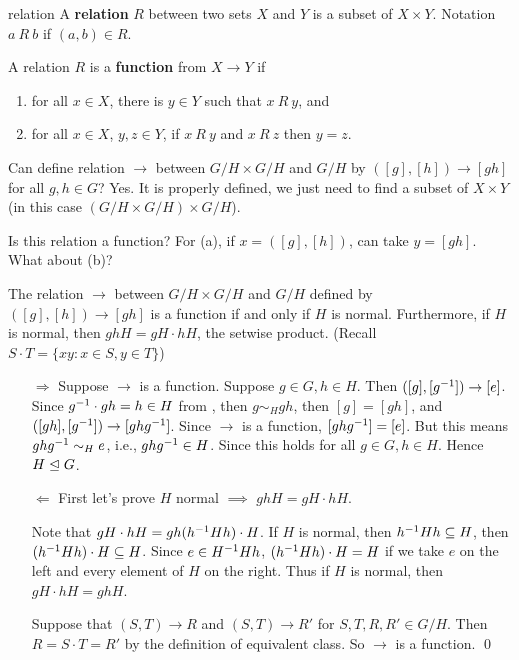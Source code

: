 \begin{defn}{relation}
A \textbf{relation} $R$ between two sets $X$ and $Y$ is a subset of $X\times Y$. Notation $a~R~b$ if $(a,b)\in R$.

A relation $R$ is a \textbf{function} from $X\to Y$ if 
\begin{enumerate}[label=(\alph*)]
\item for all $x\in X$, there is $y\in Y$ such that $x ~R~ y$, and 
\item for all $x\in X$, $y,z\in Y$, if $x ~R~ y$ and $x ~R~ z$ then $y=z$.
\end{enumerate}
\end{defn}

Can define relation $\to$ between $G/H\times G/H$ and $G/H$ by $([g],[h])\to [gh]$ for all $g,h\in G$? Yes. It is properly defined, we just need to find a subset of $X\times Y$ (in this case $(G/H\times G/H)\times G/H$).

Is this relation a function? For (a), if $x=([g],[h])$, can take $y=[gh]$. What about (b)?

\begin{lemma}
The relation $\to$ between $G/H\times G/H$ and $G/H$ defined by $([g],[h])\to [gh]$ is a function if and only if  $H$ is normal.
Furthermore, if $H$ is normal, then $ghH = gH\cdot hH$, the setwise product. (Recall $S\cdot T=\{xy:x\in S,y\in T\}$)
\end{lemma}

\begin{pfno}
\begin{itemize}
\item[$\Rightarrow$] Suppose $\to$ is a function. Suppose $g\in G, h\in H$. Then $([g],[g^{-1}])\to [e]$. Since $g^{-1} \cdot gh = h\in H$ from , then $g\sim_Hgh$, then $[g]=[gh]$, and $([gh],[g^{-1}])\to [ghg^{-1}]$. Since $\to$ is a function, $[ghg^{-1}]=[e]$. But this means $ghg^{-1} \sim_H e$, i.e., $ghg^{-1} \in H$. Since this holds for all $g\in G, h\in H$. Hence $H\trianglelefteq G$. 
\item[$\Leftarrow$] First let's prove $H$ normal $\implies$ $ghH = gH\cdot hH$. 

Note that $gH\cdot hH=gh(h^{-1} Hh) \cdot H$. If $H$ is normal, then $h^{-1} Hh\subseteq H$, then $(h^{-1} Hh)\cdot H\subseteq H$. Since $e\in H^{-1} Hh$, $(h^{-1} Hh)\cdot H=H$ if we take $e$ on the left and every element of $H$ on the right. Thus if $H$ is normal, then $gH\cdot hH=ghH$.

Suppose that $(S,T)\to R$ and $(S,T)\to R'$ for $S,T,R,R'\in G/H$. Then $R=S\cdot T=R'$ by the definition of equivalent class. So $\to$ is a function.
\qed
\end{itemize}
\end{pfno}

